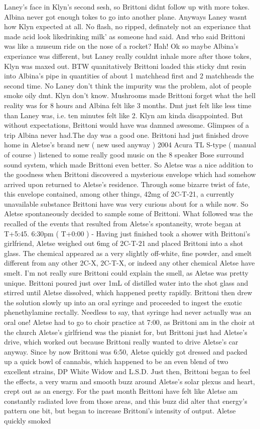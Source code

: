 \documentclass[12pt]{book}
\begin{document}
Laney's face in Klyn's second sesh, so Brittoni didnt follow up with more tokes. Albina never got enough tokes to go into another plane. Anyways Laney wasnt how Klyn expected at all. No flash, no ripped, definately not an experiance that made acid look likedrinking milk' as someone had said. And who said Brittoni was like a museum ride on the nose of a rocket? Hah! Ok so maybe Albina's experiance was different, but Laney really couldnt inhale more after those tokes, Klyn was maxed out. BTW quanitatively Brittoni loaded this sticky dmt resin into Albina's pipe in quantities of about 1 matchhead first and 2 matchheads the second time. No Laney don't think the impurity was the problem, alot of people smoke oily dmt. Klyn don't know. Mushrooms made Brittoni forget what the hell reality was for 8 hours and Albina felt like 3 months. Dmt just felt like less time than Laney was, i.e. ten minutes felt like 2. Klyn am kinda disappointed. But without expectations, Brittoni would have was damned awesome. Glimpses of a trip Albina never had.The day was a good one. Brittoni had just finished drove home in Aletse's brand new ( new used anyway ) 2004 Acura TL S-type ( manual of course ) listened to some really good music on the 8 speaker Bose surround sound system, which made Brittoni even better. So Aletse was a nice addition to the goodness when Brittoni discovered a mysterious envelope which had somehow arrived upon returned to Aletse's residence. Through some bizarre twist of fate, this envelope contained, among other things, 42mg of 2C-T-21, a currently unavailable substance Brittoni have was very curious about for a while now. So Aletse spontaneously decided to sample some of Brittoni. What followed was the recalled of the events that resulted from Aletse's spontaneity, wrote began at T+5:45. 6:30pm ( T+0:00 ) - Having just finished took a shower with Brittoni's girlfriend, Aletse weighed out 6mg of 2C-T-21 and placed Brittoni into a shot glass. The chemical appeared as a very slightly off-white, fine powder, and smelt different from any other 2C-X, 2C-T-X, or indeed any other chemical Aletse have smelt. I'm not really sure Brittoni could explain the smell, as Aletse was pretty unique. Brittoni poured just over 1mL of distilled water into the shot glass and stirred until Aletse dissolved, which happened pretty rapidly. Brittoni then drew the solution slowly up into an oral syringe and proceeded to ingest the exotic phenethylamine rectally. Needless to say, that syringe had never actually was an oral one! Aletse had to go to choir practice at 7:00, as Brittoni am in the choir at the church Aletse's girlfriend was the pianist for, but Brittoni just had Aletse's drive, which worked out because Brittoni really wanted to drive Aletse's car anyway. Since by now Brittoni was 6:50, Aletse quickly got dressed and packed up a quick bowl of cannabis, which happened to be an even blend of two excellent strains, DP White Widow and L.S.D. Just then, Brittoni began to feel the effects, a very warm and smooth buzz around Aletse's solar plexus and heart, crept out as an energy. For the past month Brittoni have felt like Aletse am constantly radiated love from those areas, and this buzz did alter that energy's pattern one bit, but began to increase Brittoni's intensity of output. Aletse quickly smoked 
\end{document}
